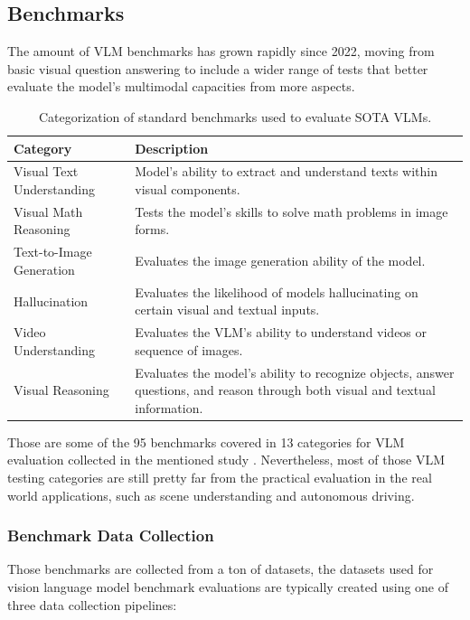 \subsection{Benchmarks}
The amount of VLM benchmarks has grown rapidly since 2022, moving from basic visual question answering to include a wider range of tests that better evaluate the model's multimodal capacities from more aspects.

\begin{table}[htbp]
	\centering
	\small
	\begin{tabularx}{\textwidth}{@{} l X @{}}
		\toprule
		\textbf{Category} & \textbf{Description} \\
		\midrule
		Visual Text Understanding & Model's ability to extract and understand texts within visual components. \\
		\addlinespace
		Visual Math Reasoning    & Tests the model's skills to solve math problems in image forms. \\
		\addlinespace
		Text-to-Image Generation & Evaluates the image generation ability of the model. \\
		\addlinespace
		Hallucination            & Evaluates the likelihood of models hallucinating on certain visual and textual inputs. \\
		\addlinespace
		Video Understanding      & Evaluates the VLM's ability to understand videos or sequence of images. \\
		\addlinespace
		Visual Reasoning         & Evaluates the model's ability to recognize objects, answer questions, and reason through both visual and textual information. \\
		\bottomrule
	\end{tabularx}
	\vspace{5pt}
	\caption{Categorization of standard benchmarks used to evaluate SOTA VLMs.}
	\label{tab:benchmarks}
\end{table}

Those are some of the 95 benchmarks covered in 13 categories for VLM evaluation collected in the mentioned study \cite{li2025surveystateartlarge}. Nevertheless, most of those VLM testing categories are still pretty far from the practical evaluation in the real world applications, such as scene understanding and autonomous driving. 

\subsubsection{Benchmark Data Collection} 
Those benchmarks are collected from a ton of datasets, the datasets used for vision language model benchmark evaluations are typically created using one of three data collection pipelines:

